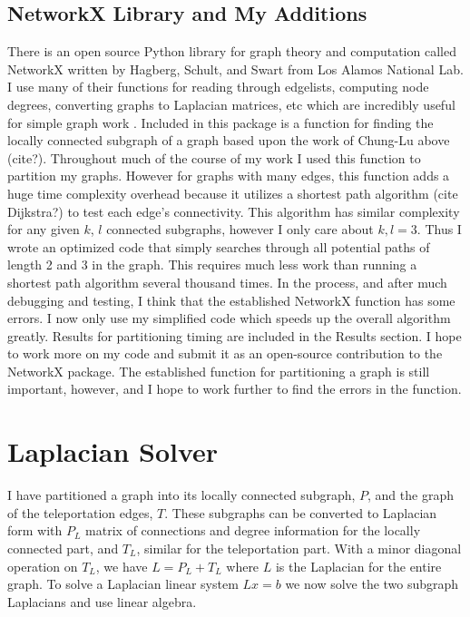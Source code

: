 \documentclass{article}
\begin{document}
\subsection{NetworkX Library and My Additions}
There is an open source Python library for graph theory and computation called NetworkX written by Hagberg, Schult, and Swart from Los Alamos National Lab. I use many of their functions for reading through edgelists, computing node degrees, converting graphs to Laplacian matrices, etc which are incredibly useful for simple graph work \cite{Hagberg:2008}. Included in this package is a function for finding the locally connected subgraph of a graph based upon the work of Chung-Lu above (cite?). Throughout much of the course of my work I used this function to partition my graphs. However for graphs with many edges, this function adds a huge time complexity overhead because it utilizes a shortest path algorithm (cite Dijkstra?) to test each edge's connectivity. This algorithm has similar complexity for any given $k$, $l$ connected subgraphs, however I only care about $k,l = 3$. Thus I wrote an optimized code that simply searches through all potential paths of length 2 and 3 in the graph. This requires much less work than running a shortest path algorithm several thousand times. In the process, and after much debugging and testing, I think that the established NetworkX function has some errors. I now only use my simplified code which speeds up the overall algorithm greatly. Results for partitioning timing are included in the Results section. I hope to work more on my code and submit it as an open-source contribution to the NetworkX package. The established function for partitioning a graph is still important, however, and I hope to work further to find the errors in the function.

\section{Laplacian Solver}
I have partitioned a graph into its locally connected subgraph, $P$, and the graph of the teleportation edges, $T$. These subgraphs can be converted to Laplacian form with $P_L$ matrix of connections and degree information for the locally connected part, and $T_L$, similar for the teleportation part. With a minor diagonal operation on $T_L$, we have $L = P_L + T_L$ where $L$ is the Laplacian for the entire graph. To solve a Laplacian linear system $Lx=b$ we now solve the two subgraph Laplacians and use linear algebra.
\end{document}
